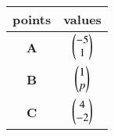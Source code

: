 \begin{tabular}{|c|c|}
\hline
\textbf{points} & \textbf{values}\\
\hline
\textbf{A} & $\begin{pmatrix}-5\\1\end{pmatrix}$\\
\hline
\textbf{B} & $\begin{pmatrix}1\\p\end{pmatrix}$\\
\hline
\textbf{C} & $\begin{pmatrix}4\\-2\end{pmatrix}$\\
\hline
\end{tabular}
